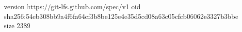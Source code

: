 version https://git-lfs.github.com/spec/v1
oid sha256:54eb308bb9a4f6fa64cf3b8be125e4e35d5cd08a63c05cfcb06062e3327b3bbe
size 2389
